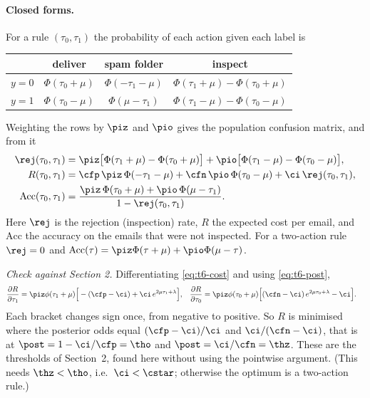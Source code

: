 \paragraph{Closed forms.}
For a rule $(\tau_0,\tau_1)$ the probability of each action given each label is
\begin{center}
\begin{tabular}{lccc}
\toprule
 & deliver & spam folder & inspect \\
\midrule
$y=0$ & $\Phi(\tau_0+\mu)$ & $\Phi(-\tau_1-\mu)$ & $\Phi(\tau_1+\mu)-\Phi(\tau_0+\mu)$ \\
$y=1$ & $\Phi(\tau_0-\mu)$ & $\Phi(\mu-\tau_1)$  & $\Phi(\tau_1-\mu)-\Phi(\tau_0-\mu)$ \\
\bottomrule
\end{tabular}
\end{center}
Weighting the rows by $\piz$ and $\pio$ gives the population confusion matrix, and from it
\begin{align}
  \rej(\tau_0,\tau_1) &= \piz\big[\Phi(\tau_1+\mu)-\Phi(\tau_0+\mu)\big]
                        + \pio\big[\Phi(\tau_1-\mu)-\Phi(\tau_0-\mu)\big], \label{eq:t6-rho}\\
  R(\tau_0,\tau_1)    &= \cfp\,\piz\,\Phi(-\tau_1-\mu) + \cfn\,\pio\,\Phi(\tau_0-\mu) + \ci\,\rej(\tau_0,\tau_1),
                        \label{eq:t6-cost}\\
  \mathrm{Acc}(\tau_0,\tau_1) &= \frac{\piz\,\Phi(\tau_0+\mu) + \pio\,\Phi(\mu-\tau_1)}{1-\rej(\tau_0,\tau_1)} .
                        \label{eq:t6-acc}
\end{align}
Here $\rej$ is the rejection (inspection) rate, $R$ the expected cost per email, and
$\mathrm{Acc}$ the accuracy on the emails that were not inspected. For a two-action rule
$\rej=0$ and $\mathrm{Acc}(\tau) = \piz\Phi(\tau+\mu)+\pio\Phi(\mu-\tau)$.

\emph{Check against Section 2.} Differentiating \eqref{eq:t6-cost} and using \eqref{eq:t6-post},
\begin{align*}
  \frac{\partial R}{\partial \tau_1} &= \piz\phi(\tau_1+\mu)\Big[-(\cfp-\ci) + \ci\, e^{2\mu\tau_1+\lambda}\Big], &
  \frac{\partial R}{\partial \tau_0} &= \piz\phi(\tau_0+\mu)\Big[(\cfn-\ci)\,e^{2\mu\tau_0+\lambda} - \ci\Big].
\end{align*}
Each bracket changes sign once, from negative to positive. So $R$ is minimised where the posterior
odds equal $(\cfp-\ci)/\ci$ and $\ci/(\cfn-\ci)$, that is at $\post=1-\ci/\cfp=\tho$ and
$\post=\ci/\cfn=\thz$. These are the thresholds of Section~2, found here without using the
pointwise argument. (This needs $\thz<\tho$, i.e.\ $\ci<\cstar$; otherwise the optimum is a
two-action rule.)

